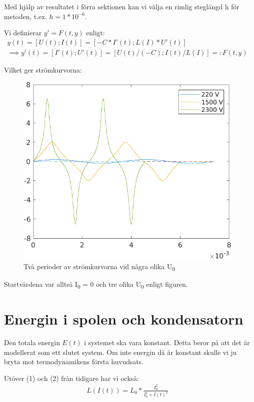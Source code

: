 \documentclass[a4paper, titlepage, 11pt]{article}
\begin{document}
Med hjälp av resultatet i förra sektionen kan vi välja en rimlig steglängd h för metoden, t.ex.
$h = 1*10^{-6}$.

Vi definierar $y' = F(t, y)$ enligt:
\begin{gather*}
 y(t) = [U(t); I(t)] = [-C * I'(t); L(I) * U'(t)] \\
 \implies y'(t) = [I'(t); U'(t)] = [U(t)/(-C); I(t)/L(I)] =: F(t, y)
\end{gather*}

Vilket ger strömkurvorna:

\begin{figure}[H]
  \includegraphics[width=\linewidth]{currents3.png}
  \caption{Två perioder av strömkurvorna vid några olika U\textsubscript{0}}
\end{figure}

Startvärdena var alltså I\textsubscript{0} = 0 och tre olika U\textsubscript{0} enligt figuren.


\section{Energin i spolen och kondensatorn}
Den totala energin $E(t)$ i systemet ska vara konstant. Detta beror på att det är modellerat som ett slutet system. Om inte energin då är konstant skulle vi ju bryta mot termodynamikens första huvudsats.

Utöver (1) och (2) från tidigare har vi också:
\begin{gather}
    L(I(t)) = L_0 * \frac{I_0^2}{I_0^2 + I(t)^2}
\end{gather}
\end{document}
